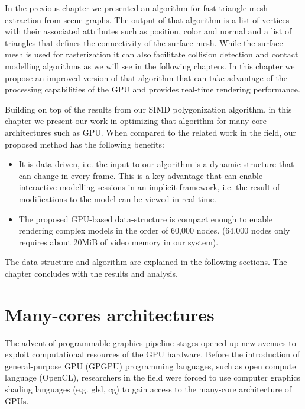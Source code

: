 \label{chapter:GPUDiscretization}
In the previous chapter we presented an algorithm for fast triangle mesh extraction from \blob scene graphs. The output of that 
algorithm is a list of vertices with their associated attributes such as position, color and normal and a list of triangles that
defines the connectivity of the surface mesh. While the surface mesh is used for rasterization it can also facilitate  
collision detection and contact modelling algorithms as we will see in the following chapters.  In this chapter we propose an improved 
version of that algorithm that can take advantage of the processing capabilities of the GPU and provides real-time \blob rendering performance. 

Building on top of the results from our SIMD polygonization algorithm, in this chapter we present our work in optimizing that 
algorithm for many-core architectures such as GPU. When compared to the related work in the field, our proposed method has the following
benefits:

\begin{itemize}
 \item It is data-driven, i.e. the input to our algorithm is a dynamic \blob structure that can change 
 in every frame. This is a key advantage that can enable interactive modelling sessions in an implicit 
 framework, i.e. the result of modifications to the model can be viewed in real-time.

 \item The proposed GPU-based data-structure is compact enough to enable rendering complex \blob models 
 in the order of 60,000 nodes. (64,000 nodes only requires about 20MiB of video memory in our system).
\end{itemize}

The data-structure and algorithm are explained in the following sections. The chapter concludes with 
the results and analysis.

\section{Many-cores architectures}
The advent of programmable graphics pipeline stages opened up new avenues to exploit computational resources of the
GPU hardware. Before the introduction of general-purpose GPU (GPGPU) programming languages, such as open compute language (OpenCL), 
researchers in the field were forced to use computer graphics shading languages (e.g. glsl, cg) to gain access to 
the many-core architecture of GPUs. 

